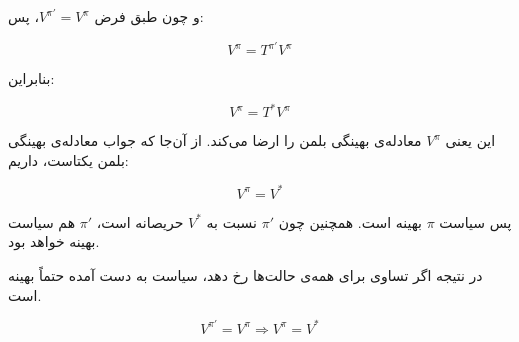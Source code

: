 \begin{enumerate}
و چون طبق فرض \(V^{\pi'}=V^\pi\)، پس:

\[
V^\pi = T^{\pi'}V^\pi
\]

بنابراین:

\[
V^\pi = T^*V^\pi
\]

این یعنی \(V^\pi\) معادله‌ی بهینگی بلمن را ارضا می‌کند. از آن‌جا که جواب معادله‌ی بهینگی بلمن یکتاست، داریم:

\[
V^\pi = V^*
\]

پس سیاست \(\pi\) بهینه است. همچنین چون \(\pi'\) نسبت به \(V^*\) حریصانه است، \(\pi'\) هم سیاست بهینه خواهد بود.

در نتیجه اگر تساوی برای همه‌ی حالت‌ها رخ دهد، سیاست به دست آمده حتماً بهینه است.

\[
\boxed{
V^{\pi'}=V^\pi \Longrightarrow V^\pi=V^*
}
\]

\end{enumerate}